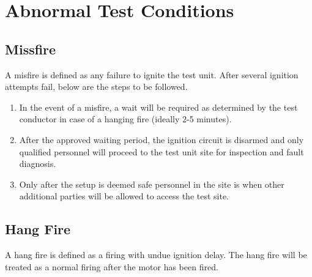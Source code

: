 \documentclass[12pt,letterpaper]{article}
\begin{document}
    \section{Abnormal Test Conditions}
        \subsection{Missfire}
            \noindent A misfire is defined as any failure to ignite the test
            unit. After several ignition attempts fail, below are the steps to
            be followed.
            \begin{enumerate}
                \begin{enumerate}
                    \item In the event of a misfire, a wait will be required as
                    determined by the test conductor in case of a hanging fire
                    (ideally 2-5 minutes).
                    \item After the approved waiting period, the ignition circuit
                    is disarmed and only qualified personnel will proceed to the
                    test unit site for inspection and fault diagnosis.
                    \item Only after the setup is deemed safe personnel in the
                    site is when other additional parties will be allowed to
                    access the test site.
                \end{enumerate}
            \end{enumerate}
        \subsection{Hang Fire}
            \noindent A hang fire is defined as a firing with undue ignition
            delay. The hang fire will be treated as a normal firing after the
            motor has been fired.
\end{document}
